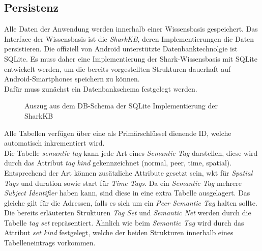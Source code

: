\subsection{Persistenz}
Alle Daten der Anwendung werden innerhalb einer Wissensbasis gespeichert. Das Interface der Wissensbasis ist die \textit{SharkKB}, deren Implementierungen die Daten persistieren. Die offiziell von Android unterstützte Datenbanktechnolgie ist SQLite. Es muss daher eine Implementierung der Shark-Wissensbasis mit SQLite entwickelt werden, um die bereits vorgestellten Strukturen dauerhaft auf Android-Smartphones speichern zu können. 
\\Dafür muss zunächst ein Datenbankschema festgelegt werden. 
\begin{figure}[H]
	\centering
	\caption{Auszug aus dem DB-Schema der SQLite Implementierung der SharkKB}
	\label{fig:sharkSQL}
\end{figure}
Alle Tabellen verfügen über eine als Primärschlüssel dienende ID, welche automatisch inkrementiert wird. \\Die Tabelle \textit{semantic tag} kann jede Art eines \textit{Semantic Tag} darstellen, diese wird durch das Attribut \textit{tag kind} gekennzeichnet (normal, peer, time, spatial). Entsprechend der Art können zusätzliche Attribute gesetzt sein, wkt für \textit{Spatial Tags} und duration sowie start für \textit{Time Tags}. Da ein \textit{Semantic Tag} mehrere \textit{Subject Identifier} haben kann, sind diese in eine extra Tabelle ausgelagert. Das gleiche gilt für die Adressen, falls es sich um ein \textit{Peer Semantic Tag} halten sollte. 
\\Die bereits erläuterten Strukturen \textit{Tag Set} und \textit{Semantic Net} werden durch die Tabelle \textit{tag set} repräsentiert. Ähnlich wie beim \textit{Semantic Tag} wird durch das Attribut \textit{set kind} festgelegt, welche der beiden Strukturen innerhalb eines Tabelleneintrags vorkommen.
